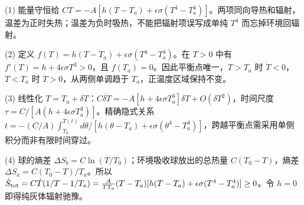 (1) 能量守恒给 \(C\dot T=-A[h(T-T_a)+\epsilon\sigma(T^4-T_a^4)]\)。两项同向导热和辐射，温差为正时失热；温差为负时吸热，不能把辐射项误写成单纯 \(T^4\) 而忘掉环境回辐射。

(2) 定义 \(f(T)=h(T-T_a)+\epsilon\sigma(T^4-T_a^4)\)。在 \(T>0\) 中有 \(f'(T)=h+4\epsilon\sigma T^3>0\)，且 \(f(T_a)=0\)。因此平衡点唯一，\(T>T_a\) 时 \(\dot T<0\)，\(T<T_a\) 时 \(\dot T>0\)，从两侧单调趋于 \(T_a\)，正温度区域保持不变。

(3) 线性化 \(T=T_a+\delta T\)：\(C\dot{\delta T}=-A[h+4\epsilon\sigma T_a^3]\delta T+O(\delta T^2)\)，时间尺度 \(\tau=C/[A(h+4\epsilon\sigma T_a^3)]\)。精确隐式关系 \(t=-(C/A)\int_{T_0}^{T(t)}d\theta/[h(\theta-T_a)+\epsilon\sigma(\theta^4-T_a^4)]\)，跨越平衡点需采用单侧积分而非有限时间穿过。

(4) 球的熵差 \(\Delta S_b=C\ln(T/T_0)\)；环境吸收球放出的总热量 \(C(T_0-T)\)，熵差 \(\Delta S_a=C(T_0-T)/T_a\)。所以 \(\dot S_{\rm tot}=C\dot T(1/T-1/T_a)=\frac{A}{TT_a}(T-T_a)[h(T-T_a)+\epsilon\sigma(T^4-T_a^4)]\ge0\)。令 \(h=0\) 即得纯灰体辐射驰豫。

